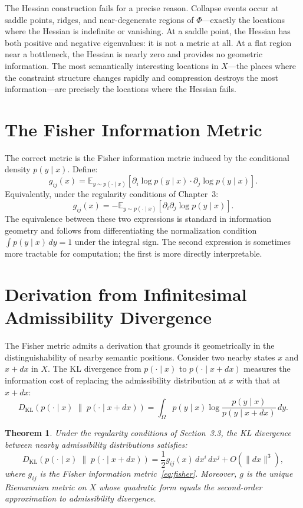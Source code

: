 \documentclass[12pt, oneside]{book}
\theoremstyle{plain-flyxion}
\newtheorem{theorem}{Theorem}[chapter]
\theoremstyle{definition-flyxion}
\newcommand{\Phifield}{\Phi}
\begin{document}
The Hessian construction fails for a precise reason. Collapse events occur at saddle
points, ridges, and near-degenerate regions of $\Phifield$---exactly the locations where
the Hessian is indefinite or vanishing. At a saddle point, the Hessian has both positive
and negative eigenvalues: it is not a metric at all. At a flat region near a bottleneck,
the Hessian is nearly zero and provides no geometric information. The most semantically
interesting locations in $X$---the places where the constraint structure changes rapidly
and compression destroys the most information---are precisely the locations where the
Hessian fails.

\section{The Fisher Information Metric}

The correct metric is the Fisher information metric induced by the conditional density
$p(y\mid x)$. Define:
\begin{equation}\label{eq:fisher}
g_{ij}(x) = \mathbb{E}_{y\sim p(\cdot\mid x)}\!\left[
  \partial_i \log p(y\mid x)\cdot\partial_j \log p(y\mid x)
\right].
\end{equation}
Equivalently, under the regularity conditions of Chapter~3:
\[
g_{ij}(x) = -\mathbb{E}_{y\sim p(\cdot\mid x)}\!\left[
  \partial_i\partial_j \log p(y\mid x)
\right].
\]
The equivalence between these two expressions is standard in information geometry and
follows from differentiating the normalization condition $\int p(y\mid x)\,dy = 1$
under the integral sign. The second expression is sometimes more tractable for
computation; the first is more directly interpretable.

\section{Derivation from Infinitesimal Admissibility Divergence}

The Fisher metric admits a derivation that grounds it geometrically in the distinguishability
of nearby semantic positions. Consider two nearby states $x$ and $x + dx$ in $X$. The
KL divergence from $p(\cdot \mid x)$ to $p(\cdot \mid x + dx)$ measures the information
cost of replacing the admissibility distribution at $x$ with that at $x + dx$:
\[
D_{\mathrm{KL}}\!\left(p(\cdot \mid x) \;\|\; p(\cdot \mid x+dx)\right)
= \int_{\Omega} p(y \mid x) \log\frac{p(y \mid x)}{p(y \mid x + dx)}\, dy.
\]

\begin{theorem}\label{thm:fisher-deriv}
Under the regularity conditions of Section~3.3, the KL divergence between nearby
admissibility distributions satisfies:
\begin{equation}\label{eq:kl-taylor}
D_{\mathrm{KL}}\!\left(p(\cdot \mid x) \;\|\; p(\cdot \mid x+dx)\right)
= \frac{1}{2} g_{ij}(x)\, dx^i\, dx^j + O(\|dx\|^3),
\end{equation}
where $g_{ij}$ is the Fisher information metric~\eqref{eq:fisher}. Moreover, $g$ is the
unique Riemannian metric on $X$ whose quadratic form equals the second-order approximation
to admissibility divergence.
\end{theorem}
\end{document}
